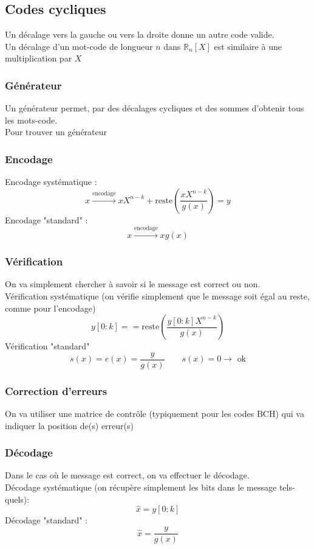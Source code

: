 \documentclass[resume.tex]{subfiles}
\begin{document}
\subsection{Codes cycliques}
Un décalage vers la gauche ou vers la droite donne un autre code valide.\\
Un décalage d'un mot-code de longueur $n$ dans $\mathbb{R}_n[X]$ est similaire à une multiplication par $X$
\subsubsection{Générateur}
Un générateur permet, par des décalages cycliques et des sommes d'obtenir tous les mots-code.\\
Pour trouver un générateur
\subsubsection{Encodage}
Encodage systématique :
$$x\xrightarrow{\text{encodage}} xX^{n-k}+\text{reste}\left(\frac{xX^{n-k}}{g(x)}\right)=y$$
Encodage "standard" :
$$x\xrightarrow{\text{encodage}} xg(x)$$
\subsubsection{Vérification}
On va simplement chercher à savoir si le message est correct ou non.\\
Vérification systématique (on vérifie simplement que le message soit égal au reste, comme pour l'encodage)
$$y[0:k] == \text{reste}\left(\frac{y[0:k]X^{n-k}}{g(x)}\right)$$
Vérification "standard"
$$s(x)=e(x)=\frac{y}{g(x)}\qquad s(x)=0\longrightarrow\text{ ok}$$
\subsubsection{Correction d'erreurs}
On va utiliser une matrice de contrôle (typiquement pour les codes BCH) qui va indiquer la position de(s) erreur(s)
\subsubsection{Décodage}
Dans le cas où le message est correct, on va effectuer le décodage.\\
Décodage systématique (on récupère simplement les bits dans le message tels-quels):
$$\hat{x}=y[0:k]$$
Décodage "standard" :
$$\hat{x}=\frac{y}{g(x)}$$
\end{document}
